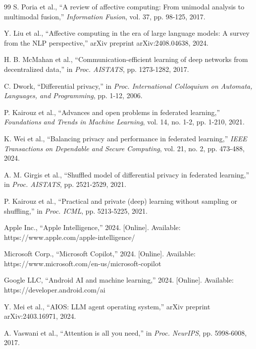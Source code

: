 \documentclass[conference]{IEEEtran}
\begin{document}
\begin{thebibliography}{99}
S. Poria et al., ``A review of affective computing: From unimodal analysis to multimodal fusion,'' \textit{Information Fusion}, vol. 37, pp. 98-125, 2017.

Y. Liu et al., ``Affective computing in the era of large language models: A survey from the NLP perspective,'' arXiv preprint arXiv:2408.04638, 2024.

H. B. McMahan et al., ``Communication-efficient learning of deep networks from decentralized data,'' in \textit{Proc. AISTATS}, pp. 1273-1282, 2017.

C. Dwork, ``Differential privacy,'' in \textit{Proc. International Colloquium on Automata, Languages, and Programming}, pp. 1-12, 2006.

P. Kairouz et al., ``Advances and open problems in federated learning,'' \textit{Foundations and Trends in Machine Learning}, vol. 14, no. 1-2, pp. 1-210, 2021.

K. Wei et al., ``Balancing privacy and performance in federated learning,'' \textit{IEEE Transactions on Dependable and Secure Computing}, vol. 21, no. 2, pp. 473-488, 2024.

A. M. Girgis et al., ``Shuffled model of differential privacy in federated learning,'' in \textit{Proc. AISTATS}, pp. 2521-2529, 2021.

P. Kairouz et al., ``Practical and private (deep) learning without sampling or shuffling,'' in \textit{Proc. ICML}, pp. 5213-5225, 2021.

Apple Inc., ``Apple Intelligence,'' 2024. [Online]. Available: https://www.apple.com/apple-intelligence/

Microsoft Corp., ``Microsoft Copilot,'' 2024. [Online]. Available: https://www.microsoft.com/en-us/microsoft-copilot

Google LLC, ``Android AI and machine learning,'' 2024. [Online]. Available: https://developer.android.com/ai

Y. Mei et al., ``AIOS: LLM agent operating system,'' arXiv preprint arXiv:2403.16971, 2024.

A. Vaswani et al., ``Attention is all you need,'' in \textit{Proc. NeurIPS}, pp. 5998-6008, 2017.


\end{thebibliography}
\end{document}
